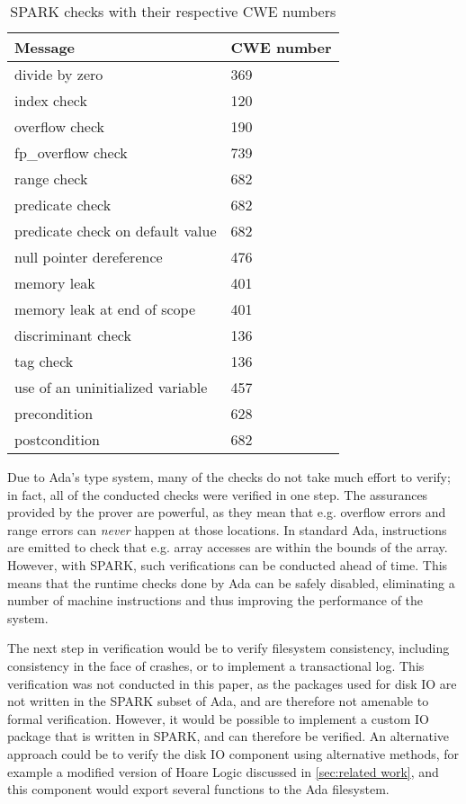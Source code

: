 \begin{table}[tb]
  \centering
  \vspace{1em}
  \renewcommand{\arraystretch}{1.5}
  \begin{tabular}{| l | l |}
    \hline
    \textbf{Message} & \textbf{CWE number} \\ \hline
    divide by zero & 369 \\ \hline
    index check & 120 \\ \hline
    overflow check & 190 \\ \hline
    fp\_overflow check & 739 \\ \hline
    range check & 682 \\ \hline
    predicate check & 682 \\ \hline
    predicate check on default value & 682 \\ \hline
    null pointer dereference & 476 \\ \hline
    memory leak & 401 \\ \hline
    memory leak at end of scope & 401 \\ \hline
    discriminant check & 136 \\ \hline
    tag check & 136 \\ \hline
    use of an uninitialized variable & 457 \\ \hline
    precondition & 628 \\ \hline
    postcondition & 682 \\ \hline
  \end{tabular}
  \renewcommand{\arraystretch}{1}
  \vspace{1em}
  \caption{SPARK checks with their respective CWE numbers}
  \label{tab:checks and cwe numbers}
\end{table}

Due to Ada's type system, many of the checks do not take much effort to verify; in fact, all of the conducted checks were verified in one step.
The assurances provided by the prover are powerful, as they mean that e.g. overflow errors and range errors can \textit{never} happen at those locations.
In standard Ada, instructions are emitted to check that e.g. array accesses are within the bounds of the array.
However, with SPARK, such verifications can be conducted ahead of time.
This means that the runtime checks done by Ada can be safely disabled, eliminating a number of machine instructions and thus improving the performance of the system.

The next step in verification would be to verify filesystem consistency, including consistency in the face of crashes, or to implement a transactional log.
This verification was not conducted in this paper, as the packages used for disk IO are not written in the SPARK subset of Ada, and are therefore not amenable to formal verification.
However, it would be possible to implement a custom IO package that is written in SPARK, and can therefore be verified.
An alternative approach could be to verify the disk IO component using alternative methods, for example a modified version of Hoare Logic discussed in \autoref{sec:related work}, and this component would export several functions to the Ada filesystem.


